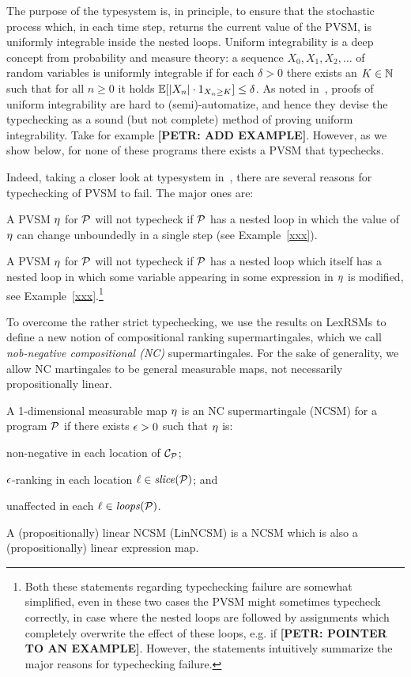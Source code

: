 The purpose of the typesystem is, in principle, to ensure that the stochastic process which, in each time step, returns the current value of the PVSM, is uniformly integrable inside the nested loops. Uniform integrability is a deep concept from probability and measure theory: a sequence $X_0,X_1,X_2,\dots$ of random variables is uniformly integrable if for each $\delta>0$ there exists an $K\in \mathbb{N}$ such that for all $n\geq 0$ it holds $\mathbb{E}[|X_n|\cdot{1}_{X_n \geq K}]\leq \delta$. As noted in~\cite{HolgerPOPL}, proofs of uniform integrability are hard to (semi)-automatize, and hence they devise the typechecking as a sound (but not complete) method of proving uniform integrability. Take for example \textbf{[PETR: ADD EXAMPLE]}. However, as we show below, for none of these programs there exists a PVSM that typechecks. 

Indeed, taking a closer look at typesystem in~\cite{HolgerPOPL}, there are several reasons for typechecking of PVSM to fail. The major ones are:
\begin{compactenum}
\item
A PVSM $\eta$ for \PP{} $\mathcal{P}$ will not typecheck if $\mathcal{P}$ has a nested loop in which the value of $\eta$ can change unboundedly in a single step (see Example~\ref{xxx}). 
\item
A PVSM $\eta$ for  \PP{} $\mathcal{P}$ will not typecheck if $\mathcal{P}$ has a nested loop which itself has a nested loop in which some variable appearing in some expression in $\eta$ is modified, see Example~\ref{xxx}.\footnote{Both these statements regarding typechecking failure are somewhat simplified, even in these two cases the PVSM might sometimes typecheck correctly, in case where the nested loops are followed by assignments which completely overwrite the effect of these loops, e.g. if \textbf{[PETR: POINTER TO AN EXAMPLE]}. However, the statements intuitively summarize the major reasons for typechecking failure. }
\end{compactenum}

To overcome the rather strict typechecking, we use the results on LexRSMs to define a new notion of compositional ranking supermartingales, which we call \emph{nob-negative compositional (NC)} supermartingales. For the sake of generality, we allow NC martingales to be general measurable maps, not necessarily propositionally linear.

\begin{definition}
\label{def:nonneg-comp}
A 1-dimensional measurable map $\eta$ is an NC supermartingale (NCSM) for a program $\mathcal{P}$ if there exists $\epsilon>0$ such that $\eta$ is:
\begin{compactenum}
\item  non-negative in each location of $\mathcal{C}_{\mathcal{P}}$;
\item 
 $\epsilon$-ranking in each location $\ell\in\mathit{slice}{(\mathcal{P})}$; and
\item 
  unaffected in each $\ell\in\mathit{loops}(\mathcal{P})$.
\end{compactenum}
A (propositionally) linear NCSM (LinNCSM) is a NCSM which is also a (propositionally) linear expression map.
\end{definition}

